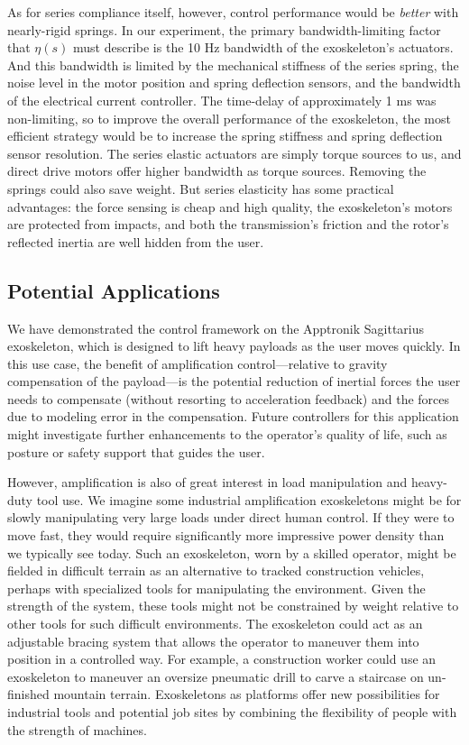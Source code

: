 \documentclass[utf8]{frontiersSCNS}
\newcommand{\add}[1]{\textcolor[HTML]{8710b3}{#1}}
\begin{document}
As for series compliance itself, however, control performance would be \emph{better} with nearly-rigid springs.
\add{In our experiment, the primary bandwidth-limiting factor that $\eta(s)$ must describe is the 10 Hz bandwidth of the exoskeleton's actuators. And this bandwidth is limited by the mechanical stiffness of the series spring, the noise level in the motor position and spring deflection sensors, and the bandwidth of the electrical current controller. The time-delay of approximately 1 ms was non-limiting, so to improve the overall performance of the exoskeleton, the most efficient strategy would be to increase the spring stiffness and spring deflection sensor resolution.}
The series elastic actuators are simply torque sources to us, and direct drive motors offer higher bandwidth as torque sources.
Removing the springs could also save weight.
But series elasticity has some practical advantages: the force sensing is cheap and high quality, the exoskeleton's motors are protected from impacts, and both the transmission's friction and the rotor's reflected inertia are well hidden from the user.


\subsection{Potential Applications}

We have demonstrated the control framework on the Apptronik Sagittarius exoskeleton, which is designed to lift heavy payloads as the user moves quickly.
In this use case, the benefit of amplification control---relative to gravity compensation of the payload---is the potential reduction of inertial forces the user needs to compensate (without resorting to acceleration feedback) and the forces due to modeling error in the compensation. Future controllers for this application might investigate further enhancements to the operator's quality of life, such as posture or safety support that guides the user.

However, amplification is also of great interest in load manipulation and heavy-duty tool use. We imagine some industrial amplification exoskeletons might be for slowly manipulating very large loads under direct human control.
If they were to move fast, they would require significantly more impressive power density than we typically see today.
Such an exoskeleton, worn by a skilled operator, might be fielded in difficult terrain as an alternative to tracked construction vehicles, perhaps with specialized tools for manipulating the environment.
Given the strength of the system, these tools might not be constrained by weight relative to other tools for such difficult environments.
The exoskeleton could act as an adjustable bracing system that allows the operator to maneuver them into position in a controlled way.
\add{For example, a construction worker could use an exoskeleton to maneuver an oversize pneumatic drill to carve a staircase on un-finished mountain terrain.}
\add{Exoskeletons as platforms offer new possibilities for industrial tools and potential job sites by combining the flexibility of people with the strength of machines.}
\end{document}
